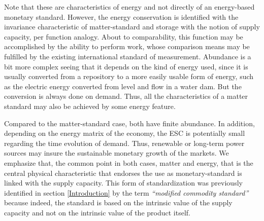\documentclass[11pt]{article}
\begin{document}
Note that these are characteristics of energy and not directly of an energy-based monetary standard. However, the energy conservation is 
identified with the invariance characteristic of matter-standard and storage with the notion of supply capacity, per function analogy. About 
to comparability, this function may be accomplished by the ability to perform work, whose comparison means may be fulfilled by the existing 
international standard of measurement. Abundance is a bit more complex seeing that it depends on the kind of energy used, since it is 
usually converted from a repository to a more easily usable form of energy, such as the electric energy converted from level and flow in a 
water dam. But the conversion is always done on demand. Thus, all the characteristics of a matter standard may also be achieved by some 
energy feature.

Compared to the matter-standard case, both have finite abundance. In addition, depending on the energy matrix of the economy, the ESC is 
potentially small regarding the time evolution of demand. Thus, renewable or long-term power sources may insure the sustainable monetary 
growth of the markets. We emphasize that, the common point in both cases, matter and energy, that is the central physical characteristic 
that endorses the use as monetary-standard is linked with the supply capacity. This form of standardization was previously identified in 
section \ref{Introduction} by the term \emph{``modified commodity standard''} because indeed, the standard is based on the intrinsic value 
of the supply capacity and not on the intrinsic value of the product itself.
\\
\end{document}
